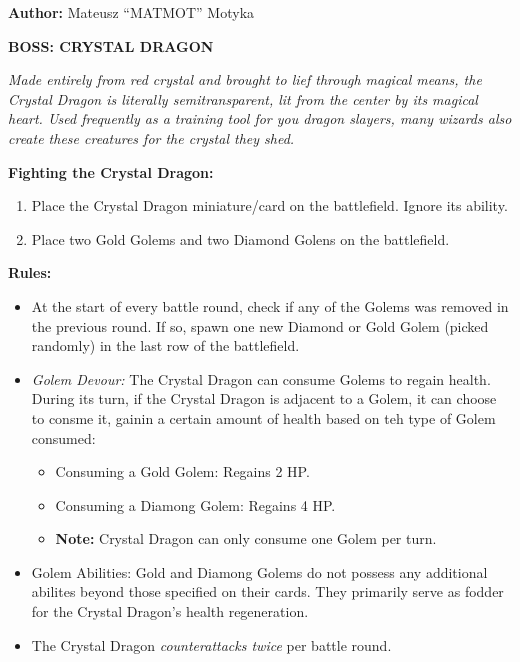 

\textbf{Author:} Mateusz ``MATMOT'' Motyka

\pagebreak

\begin{minipage}{0.3\textwidth}
\end{minipage}
\begin{minipage}{0.7\textwidth}
  \textbf{\MakeUppercase{Boss: Crystal Dragon}}

  \textit{Made entirely from red crystal and brought to lief through magical means, the Crystal Dragon is literally semitransparent, lit from the center by its magical heart.
    Used frequently as a training tool for you dragon slayers, many wizards also create these creatures for the crystal they shed.
  }

  \textbf{Fighting the Crystal Dragon:}
  \begin{enumerate}
    \item Place the Crystal Dragon miniature/card on the battlefield. Ignore its ability.
    \item Place two Gold Golems and two Diamond Golens on the battlefield.
  \end{enumerate}

  \textbf{Rules:}
  \begin{itemize}
    \item At the start of every battle round, check if any of the Golems was removed in the previous round.
      If so, spawn one new Diamond or Gold Golem (picked randomly) in the last row of the battlefield.
    \item \textit{Golem Devour:} The Crystal Dragon can consume Golems to regain health.
      During its turn, if the Crystal Dragon is adjacent to a Golem, it can choose to consme it, gainin a certain amount of health based on teh type of Golem consumed:
      \begin{itemize}
        \item Consuming a Gold Golem: Regains 2 HP.
        \item Consuming a Diamong Golem: Regains 4 HP.
        \item[] \textbf{Note:} Crystal Dragon can only consume one Golem per turn.
      \end{itemize}
    \item Golem Abilities: Gold and Diamong Golems do not possess any additional abilites beyond those specified on their cards.
      They primarily serve as fodder for the Crystal Dragon's health regeneration.
    \item The Crystal Dragon \textit{counterattacks twice} per battle round.
  \end{itemize}
\end{minipage}

